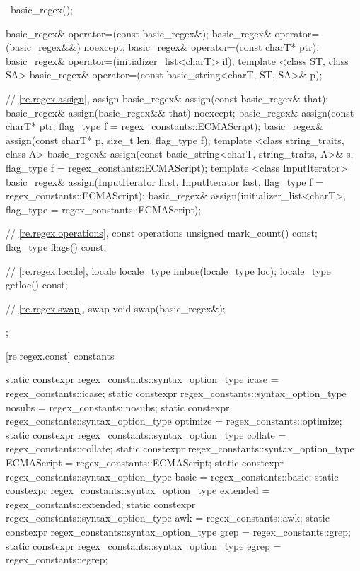 \begin{codeblock}
{{    ~basic_regex();

    basic_regex& operator=(const basic_regex&);
    basic_regex& operator=(basic_regex&&) noexcept;
    basic_regex& operator=(const charT* ptr);
    basic_regex& operator=(initializer_list<charT> il);
    template <class ST, class SA>
      basic_regex& operator=(const basic_string<charT, ST, SA>& p);

    // \ref{re.regex.assign}, assign
    basic_regex& assign(const basic_regex& that);
    basic_regex& assign(basic_regex&& that) noexcept;
    basic_regex& assign(const charT* ptr,
      flag_type f = regex_constants::ECMAScript);
    basic_regex& assign(const charT* p, size_t len, flag_type f);
    template <class string_traits, class A>
      basic_regex& assign(const basic_string<charT, string_traits, A>& s,
                          flag_type f = regex_constants::ECMAScript);
    template <class InputIterator>
      basic_regex& assign(InputIterator first, InputIterator last,
                          flag_type f = regex_constants::ECMAScript);
    basic_regex& assign(initializer_list<charT>,
                        flag_type = regex_constants::ECMAScript);

    // \ref{re.regex.operations}, const operations
    unsigned mark_count() const;
    flag_type flags() const;

    // \ref{re.regex.locale}, locale
    locale_type imbue(locale_type loc);
    locale_type getloc() const;

    // \ref{re.regex.swap}, swap
    void swap(basic_regex&);
  };
}
\end{codeblock}

[re.regex.const]{ constants}
%

\begin{codeblock}
static constexpr regex_constants::syntax_option_type
  icase = regex_constants::icase;
static constexpr regex_constants::syntax_option_type
  nosubs = regex_constants::nosubs;
static constexpr regex_constants::syntax_option_type
  optimize = regex_constants::optimize;
static constexpr regex_constants::syntax_option_type
  collate = regex_constants::collate;
static constexpr regex_constants::syntax_option_type
  ECMAScript = regex_constants::ECMAScript;
static constexpr regex_constants::syntax_option_type
  basic = regex_constants::basic;
static constexpr regex_constants::syntax_option_type
  extended = regex_constants::extended;
static constexpr regex_constants::syntax_option_type
  awk = regex_constants::awk;
static constexpr regex_constants::syntax_option_type
  grep = regex_constants::grep;
static constexpr regex_constants::syntax_option_type
  egrep = regex_constants::egrep;
\end{codeblock}

